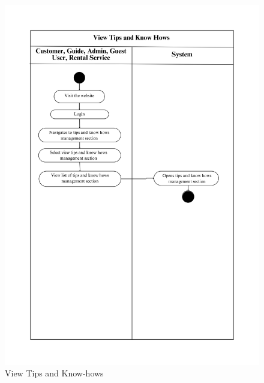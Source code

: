 \begin{figure}[h!]
    \centering
    \includegraphics[width=1\textwidth]{Images/Activity Diagrams/32 View Tips and Know Hows.png}
    \caption{View Tips and Know-hows}
    \label{fig:activity-view-tips}
\end{figure}

